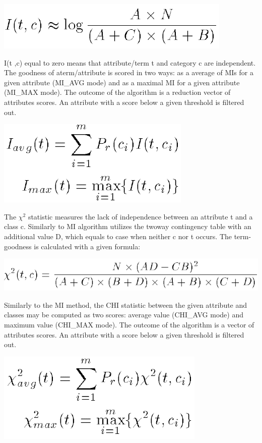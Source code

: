 \documentclass[12pt,a4paper]{report}
\begin{document}
\includegraphics[scale=0.8]{MI1}

I(t ,c) equal to zero means that attribute/term t and category c are independent. The goodness of aterm/attribute is scored in two ways: as a average of MIs for a given attribute (MI\_AVG mode) and as a maximal MI for a given attribute (MI\_MAX mode). The outcome of the algorithm is a reduction vector of attributes scores. An attribute with a score below a given threshold is filtered out.

\includegraphics[scale=0.8]{MI_scores}



The \({\chi}^2\) statistic measures the lack of independence between an attribute t and a class c. Similarly to MI algorithm utilizes the twoway contingency table with an additional value D, which equals to case when neither c nor t occurs. The term-goodness is calculated with a given formula:

\includegraphics[scale=0.8]{CHI1}

Similarly to the MI method, the CHI statistic between the given attribute and classes may be computed as two scores: average value (CHI\_AVG mode) and maximum value (CHI\_MAX mode). The outcome of the algorithm is a vector of attributes scores. An attribute with a score below a given threshold is filtered out.

\includegraphics[scale=0.8]{CHI_scores}
\end{document}
